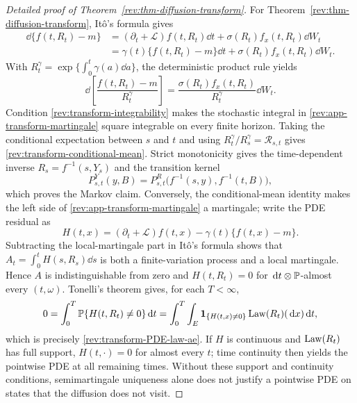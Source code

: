 \begin{proof}[Detailed proof of Theorem~\ref{rev:thm-diffusion-transform}]
For Theorem~\ref{rev:thm-diffusion-transform}, It\^o's formula gives
\begin{align*}
\dd\{f(t,R_t)-m\}
&=(\partial_t+\mathcal L)f(t,R_t)\dd t
  +\sigma(R_t)f_x(t,R_t)\dd W_t\\
&=\gamma(t)\{f(t,R_t)-m\}\dd t
  +\sigma(R_t)f_x(t,R_t)\dd W_t.
\end{align*}
With $R_t^\gamma=\exp\{\int_0^t\gamma(a)\dd a\}$, the deterministic product
rule yields
\begin{equation}
\dd\!\left[\frac{f(t,R_t)-m}{R_t^\gamma}\right]
=\frac{\sigma(R_t)f_x(t,R_t)}{R_t^\gamma}\dd W_t.
\label{rev:app-transform-martingale}
\end{equation}
Condition \eqref{rev:transform-integrability} makes the stochastic integral in
\eqref{rev:app-transform-martingale} square integrable on every finite
horizon.  Taking the conditional expectation between $s$ and $t$ and using
$R_t^\gamma/R_s^\gamma=\mathcal R_{s,t}$ gives
\eqref{rev:transform-conditional-mean}.  Strict monotonicity gives the
time-dependent inverse $R_s=f^{-1}(s,Y_s)$ and the transition kernel
\[
P^Y_{s,t}(y,B)
=P^R_{s,t}\bigl(f^{-1}(s,y),f^{-1}(t,B)\bigr),
\]
which proves the Markov claim.  Conversely, the conditional-mean identity
makes the left side of \eqref{rev:app-transform-martingale} a martingale;
write the PDE residual as
\[
 H(t,x)=(\partial_t+\mathcal L)f(t,x)
       -\gamma(t)\{f(t,x)-m\}.
\]
Subtracting the local-martingale part in It\^o's formula shows that
$A_t=\int_0^tH(s,R_s)\dd s$ is both a finite-variation process and a local
martingale.  Hence $A$ is indistinguishable from zero and
$H(t,R_t)=0$ for $\,\mathrm d t\otimes\mathbb P$-almost every $(t,\omega)$.  Tonelli's
theorem gives, for each $T<\infty$,
\[
 0=\int_0^T\mathbb P\{H(t,R_t)\ne0\}\,\mathrm d t
  =\int_0^T\int_E\mathbf 1_{\{H(t,x)\ne0\}}
       \operatorname{Law}(R_t)(\,\mathrm d x)\,\mathrm d t,
\]
which is precisely \eqref{rev:transform-PDE-law-ae}.  If $H$ is continuous
and $\operatorname{Law}(R_t)$ has full support, $H(t,\cdot)=0$ for almost every $t$; time
continuity then yields the pointwise PDE at all remaining times.  Without
these support and continuity conditions, semimartingale uniqueness alone does
not justify a pointwise PDE on states that the diffusion does not visit.
\end{proof}

